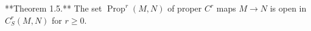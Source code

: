 **Theorem 1.5.** The set $\operatorname{Prop}^r(M,N)$ of proper $C^r$ maps $M \to N$ is open in $C^r_S(M,N)$ for $r \geq 0$.

